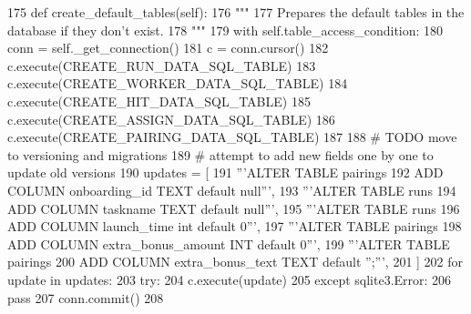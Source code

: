 \begin{DoxyCode}
175     \textcolor{keyword}{def }create\_default\_tables(self):
176         \textcolor{stringliteral}{"""}
177 \textcolor{stringliteral}{        Prepares the default tables in the database if they don't exist.}
178 \textcolor{stringliteral}{        """}
179         with self.table\_access\_condition:
180             conn = self.\_get\_connection()
181             c = conn.cursor()
182             c.execute(CREATE\_RUN\_DATA\_SQL\_TABLE)
183             c.execute(CREATE\_WORKER\_DATA\_SQL\_TABLE)
184             c.execute(CREATE\_HIT\_DATA\_SQL\_TABLE)
185             c.execute(CREATE\_ASSIGN\_DATA\_SQL\_TABLE)
186             c.execute(CREATE\_PAIRING\_DATA\_SQL\_TABLE)
187 
188             \textcolor{comment}{# TODO move to versioning and migrations}
189             \textcolor{comment}{# attempt to add new fields one by one to update old versions}
190             updates = [
191                 \textcolor{stringliteral}{'''ALTER TABLE pairings}
192 \textcolor{stringliteral}{                   ADD COLUMN onboarding\_id TEXT default null'''},
193                 \textcolor{stringliteral}{'''ALTER TABLE runs}
194 \textcolor{stringliteral}{                   ADD COLUMN taskname TEXT default null'''},
195                 \textcolor{stringliteral}{'''ALTER TABLE runs}
196 \textcolor{stringliteral}{                   ADD COLUMN launch\_time int default 0'''},
197                 \textcolor{stringliteral}{'''ALTER TABLE pairings}
198 \textcolor{stringliteral}{                   ADD COLUMN extra\_bonus\_amount INT default 0'''},
199                 \textcolor{stringliteral}{'''ALTER TABLE pairings}
200 \textcolor{stringliteral}{                   ADD COLUMN extra\_bonus\_text TEXT default '';'''},
201             ]
202             \textcolor{keywordflow}{for} update \textcolor{keywordflow}{in} updates:
203                 \textcolor{keywordflow}{try}:
204                     c.execute(update)
205                 \textcolor{keywordflow}{except} sqlite3.Error:
206                     \textcolor{keywordflow}{pass}
207             conn.commit()
208 
\end{DoxyCode}
\mbox{\label{classparlai_1_1mturk_1_1core_1_1legacy__2018_1_1mturk__data__handler_1_1MTurkDataHandler_a7cf4512d458d9e2d2867f4252f1ac2f9}} 

